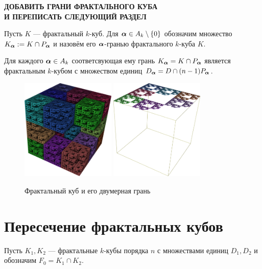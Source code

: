 {\bf ДОБАВИТЬ ГРАНИ ФРАКТАЛЬНОГО КУБА\\
И ПЕРЕПИСАТЬ СЛЕДУЮЩИЙ РАЗДЕЛ}

\begin{definition} 
Пусть $K$ --- фрактальный $k$-куб.
Для ${\bm{\alpha}}\in A_k\setminus\{0\}$ обозначим множество $K_{\bm{\alpha}}:=K\cap P_{\bm{\alpha}}$ и назовём его ${\bm{\alpha}}$-гранью фрактального $k$-куба $K$.
\end{definition}

\begin{theorem}\label{bma0}
Для каждого ${\bm{\alpha}}\in A_k$ соответсвующая ему грань $K_{\bm{\alpha}} = K\cap P_{\bm{\alpha}}$ является фрактальным $k$-кубом с множеством единиц $D_{\bm{\alpha}} = D\cap(n-1)P_{\bm{\alpha}}$.
\end{theorem}

\begin{figure}[H]
\centering
\includegraphics[width=0.4\textwidth]{images/presentation/Qk.png}
\hfill
\includegraphics[width=0.4\textwidth]{images/presentation/Qk_a.png}
\caption{Фрактальный куб и его двумерная грань}
\end{figure}


\section{Пересечение фрактальных кубов}

Пусть $K_1, K_2$ --- фрактальные $k$-кубы порядка $n$ с множествами единиц $D_1, D_2$ и обозначим $F_0=K_1\cap K_2$.

